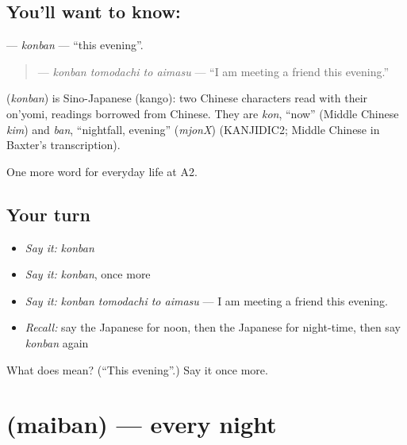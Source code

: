 \subsection*{You'll want to know: }
\textbf{} — \emph{konban} — \textquotedblleft{}this evening\textquotedblright{}.

\begin{quote}
\textbf{  } — \emph{konban tomodachi to aimasu} — \textquotedblleft{}I am meeting a friend this evening.\textquotedblright{}
\end{quote}

\begin{cousinweb}
\textbf{} (\emph{konban}) is Sino-Japanese (kango): two Chinese characters read with their on'yomi, readings borrowed from Chinese. They are \emph{kon}, \textquotedblleft{}now\textquotedblright{} (Middle Chinese \emph{kim}) and \emph{ban}, \textquotedblleft{}nightfall, evening\textquotedblright{} (\emph{mjonX}) (KANJIDIC2; Middle Chinese in Baxter's transcription).
\end{cousinweb}

\begin{grammarlens}[title={What you've built}]
One more word for everyday life at A2.
\end{grammarlens}

\subsection*{Your turn}
\begin{itemize}
\raggedright
  \item \emph{Say it:} \emph{konban}
  \item \emph{Say it:} \emph{konban}, once more
  \item \emph{Say it:} \emph{konban tomodachi to aimasu} — I am meeting a friend this evening.
  \item \emph{Recall:} say the Japanese for noon, then the Japanese for night-time, then say \emph{konban} again
\end{itemize}

\begin{tcolorbox}[breakable,colback=teal!4,colframe=teal!35!black,title={Before you move on}]
What does  mean? (\textquotedblleft{}This evening\textquotedblright{}.) Say it once more.
\end{tcolorbox}
\section[\texorpdfstring{\ja{まいばん} (maiban)}{まいばん (maiban)}]{ (maiban) — every night}

